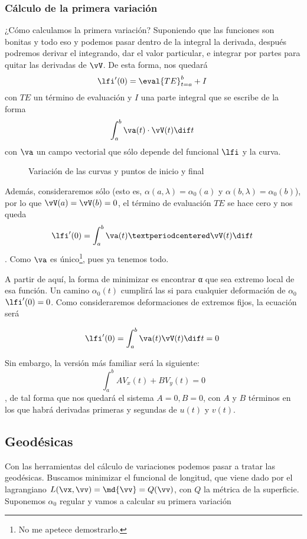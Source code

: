 \documentclass[nochap]{apuntes}
\begin{document}
\subsubsection{Cálculo de la primera variación}

¿Cómo calculamos la primera variación? Suponiendo que las funciones son bonitas y todo eso y podemos pasar dentro de la integral la derivada, después podremos derivar el integrando, dar el valor particular, e integrar por partes para quitar las derivadas de $\vV$. De esta forma, nos quedará \[ \lfi'(0) = \eval{TE}_{t=a}^{b} + I \] con $TE$ un término de evaluación y $I$ una parte integral que se escribe de la forma \[ \int_a^b \va(t) \cdot \vV(t) \dif t \] con $\va$ un campo vectorial que sólo depende del funcional $\lfi$ y la curva.

\begin{figure}[hbtp]
\caption{Variación de las curvas y puntos de inicio y final}
\end{figure}

Además, consideraremos sólo  (esto es, $α(a,λ) = α_0(a)$ y $α(b,λ) = α_0(b)$), por lo que $\vV(a) = \vV(b) = 0$, el término de evaluación $TE$ se hace cero y nos queda \[ \lfi'(0) = \int_a^b \va(t) · \vV(t) \dif t \]. Como $\va$ es único\footnote{No me apetece demostrarlo.}, pues ya tenemos todo.

A partir de aquí, la forma de minimizar es encontrar α que sea extremo local de esa función. Un camino $α_0(t)$ cumplirá las  si para cualquier deformación de $α_0$ $\lfi'(0)=0$. Como consideraremos deformaciones de extremos fijos, la ecuación será

\[ \lfi'(0) = \int_a^b \va(t) \vV(t) \dif t = 0 \]

Sin embargo, la versión más familiar será la siguiente: \[ \int_a^b A V_x (t) + B V_y(t) = 0 \], de tal forma que nos quedará el sistema $A=0, B=0$, con $A$ y $B$ términos en los que habrá derivadas primeras y segundas de $u(t)$ y $v(t)$.

\subsection{Geodésicas}

Con las herramientas del cálculo de variaciones podemos pasar a tratar las geodésicas. Buscamos minimizar el funcional de longitud, que viene dado por el lagrangiano $L(\vx, \vv) = \md{\vv} = Q(\vv)$, con $Q$ la métrica de la superficie. Suponemos $α_0$ regular y vamos a calcular su primera variación
\end{document}
